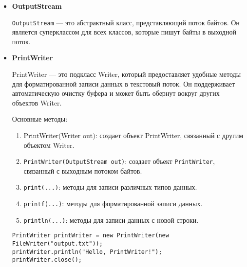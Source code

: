 \begin{itemize}
    \item \textbf{OutputStream} \par
    \texttt{OutputStream} — это абстрактный класс, представляющий поток байтов. Он является суперклассом для всех классов, которые пишут байты в выходной поток.

    \item \textbf{PrintWriter} \par
    PrintWriter — это подкласс Writer, который предоставляет удобные методы для форматированной записи данных в текстовый поток. Он поддерживает автоматическую очистку буфера и может быть обернут вокруг других объектов Writer.\par
    Основные методы:
    \begin{enumerate}
        \item PrintWriter(Writer out): создает объект PrintWriter, связанный с другим объектом Writer.
        \item \texttt{PrintWriter(OutputStream out)}: создает объект \texttt{PrintWriter}, связанный с выходным потоком байтов.
        \item \texttt{print(...)}: методы для записи различных типов данных.
        \item \texttt{printf(...)}: методы для форматированной записи данных.
        \item \texttt{println(...)}: методы для записи данных с новой строки.
    \end{enumerate}
    \begin{verbatim}
PrintWriter printWriter = new PrintWriter(new FileWriter("output.txt"));
printWriter.println("Hello, PrintWriter!");
printWriter.close();
    \end{verbatim}
\end{itemize}